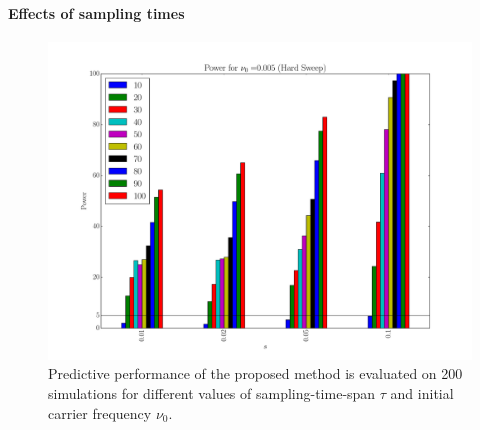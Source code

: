 \documentclass[11pt]{article}
\begin{document}
\paragraph{Effects of sampling times}
\begin{figure}
	\centering
	\includegraphics[trim=2.2in 0 2.2in 0 , clip,width=\textwidth]{powerTime}
			\caption{Predictive performance of the proposed method is evaluated 
			on 200 simulations for different values of sampling-time-span 
			$\tau$ and initial carrier frequency $\nu_0$.} \label{fig:powert}
\end{figure}
\end{document}
